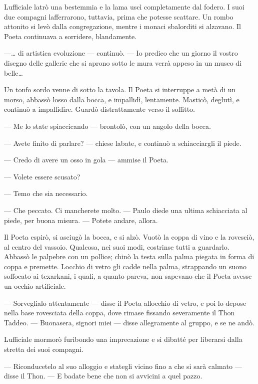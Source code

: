 L\textquotesingle ufficiale latrò una bestemmia e la lama uscì
completamente dal fodero. I suoi due compagni
l\textquotesingle afferrarono, tuttavia, prima che potesse scattare. Un
rombo attonito si levò dalla congregazione, mentre i monaci sbalorditi
si alzavano. Il Poeta continuava a sorridere, blandamente.

---\ldots{} di artistica evoluzione --- continuò. --- Io predico che un
giorno il vostro disegno delle gallerie che si aprono sotto le mura
verrà appeso in un museo di belle\ldots{}

Un tonfo sordo venne di sotto la tavola. Il Poeta si interruppe a metà
di un morso, abbassò l\textquotesingle osso dalla bocca, e impallidì,
lentamente. Masticò, deglutì, e continuò a impallidire. Guardò
distrattamente verso il soffitto.

--- Me lo state spiaccicando --- brontolò, con un angolo della bocca.

--- Avete finito di parlare? --- chiese l\textquotesingle abate, e
continuò a schiacciargli il piede.

--- Credo di avere un osso in gola --- ammise il Poeta.

--- Volete essere scusato?

--- Temo che sia necessario.

--- Che peccato. Ci mancherete molto. --- Paulo diede una ultima
schiacciata al piede, per buona misura. --- Potete andare, allora.

Il Poeta espirò, si asciugò la bocca, e si alzò. Vuotò la coppa di vino
e la rovesciò, al centro del vassoio. Qualcosa, nei suoi modi, costrinse
tutti a guardarlo. Abbassò le palpebre con un pollice; chinò la testa
sulla palma piegata in forma di coppa e premette.
L\textquotesingle occhio di vetro gli cadde nella palma, strappando un
suono soffocato ai texarkani, i quali, a quanto pareva, non sapevano che
il Poeta avesse un occhio artificiale.

--- Sorveglialo attentamente --- disse il Poeta
all\textquotesingle occhio di vetro, e poi lo depose nella base
rovesciata della coppa, dove rimase fissando severamente il Thon Taddeo.
--- Buonasera, signori miei --- disse allegramente al gruppo, e se ne
andò.

L\textquotesingle ufficiale mormorò furibondo una imprecazione e si
dibatté per liberarsi dalla stretta dei suoi compagni.

--- Riconducetelo al suo alloggio e stategli vicino fino a che si sarà
calmato --- disse il Thon. --- E badate bene che non si avvicini a quel
pazzo.

